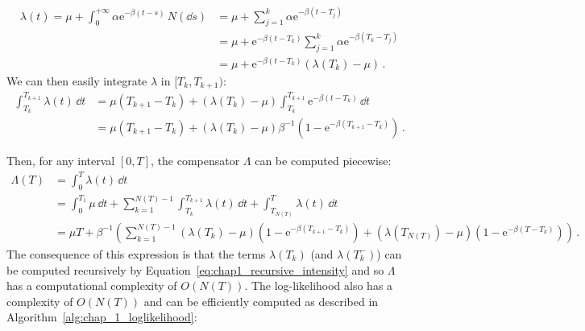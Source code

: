 \begin{align}
    \lambda(t) = \mu + \int_{0}^{+\infty}{\alpha \mathrm{e}^{-\beta(t-s)}\,N(\dd s)} &= \mu + \sum_{j=1}^{k}{\alpha \mathrm{e}^{-\beta(t-T_j)}}\nonumber\\
    &=\mu + \mathrm{e}^{-\beta(t - T_k)}\sum_{j=1}^{k}{\alpha \mathrm{e}^{-\beta(T_k-T_j)}}\nonumber\\
    &=\mu + \mathrm{e}^{-\beta(t - T_k)}\left(\lambda(T_k) - \mu\right)\label{eq:chap1_recursive_intensity}\,.
\end{align}
We can then easily integrate $\lambda$ in $[T_k,T_{k+1})$:
\begin{align*}
    \int_{T_k}^{T_{k+1}}{\lambda(t)\,\dd t} &= \mu(T_{k+1} - T_k) + (\lambda(T_k) - \mu) \int_{T_k}^{T_{k+1}}{\mathrm{e}^{-\beta(t - T_k)}\,\dd t}\\
    &= \mu(T_{k+1} - T_k) + (\lambda(T_k) - \mu)\beta^{-1}(1 - \mathrm{e}^{-\beta(T_{k+1} - T_k)})\,.
\end{align*}

Then, for any interval $[0, T]$, the compensator $\Lambda$ can be computed piecewise:
\begin{align*}
    \Lambda(T) &= \int_{0}^{T}{\lambda(t)\,\dd t}\\
    &= \int_{0}^{T_1}{\mu\,\dd t} + \sum_{k=1}^{N(T)-1}\int_{T_k}^{T_{k+1}}{\lambda(t)\,\dd t} + \int_{T_{N(T)}}^{T}{\lambda(t)\,\dd t}\\
    &= \mu T + \beta^{-1}\left(\sum_{k=1}^{N(T)-1}{(\lambda(T_k) - \mu)(1 - \mathrm{e}^{-\beta(T_{k+1} - T_k)})} + (\lambda(T_{N(T)}) - \mu)(1 - \mathrm{e}^{-\beta(T - T_k)})\right)\,.
\end{align*}
The consequence of this expression is that the terms $\lambda(T_k)$ (and $\lambda(T_k^-)$) can be computed recursively by Equation~\ref{eq:chap1_recursive_intensity} and so $\Lambda$ has a computational complexity of $O(N(T))$. 
The log-likelihood also has a complexity of $O(N(T))$ and can be efficiently computed as described in Algorithm~\ref{alg:chap_1_loglikelihood}:

